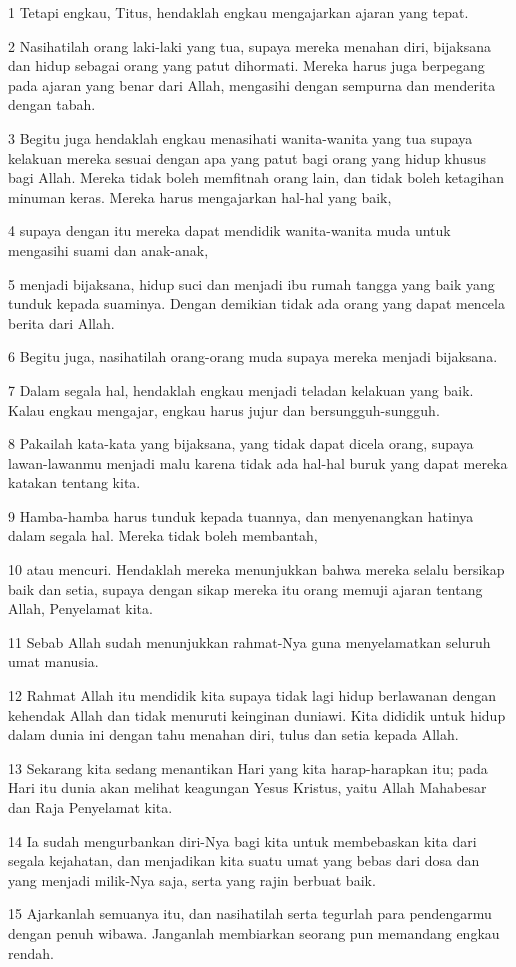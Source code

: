 \par 1 Tetapi engkau, Titus, hendaklah engkau mengajarkan ajaran yang tepat.
\par 2 Nasihatilah orang laki-laki yang tua, supaya mereka menahan diri, bijaksana dan hidup sebagai orang yang patut dihormati. Mereka harus juga berpegang pada ajaran yang benar dari Allah, mengasihi dengan sempurna dan menderita dengan tabah.
\par 3 Begitu juga hendaklah engkau menasihati wanita-wanita yang tua supaya kelakuan mereka sesuai dengan apa yang patut bagi orang yang hidup khusus bagi Allah. Mereka tidak boleh memfitnah orang lain, dan tidak boleh ketagihan minuman keras. Mereka harus mengajarkan hal-hal yang baik,
\par 4 supaya dengan itu mereka dapat mendidik wanita-wanita muda untuk mengasihi suami dan anak-anak,
\par 5 menjadi bijaksana, hidup suci dan menjadi ibu rumah tangga yang baik yang tunduk kepada suaminya. Dengan demikian tidak ada orang yang dapat mencela berita dari Allah.
\par 6 Begitu juga, nasihatilah orang-orang muda supaya mereka menjadi bijaksana.
\par 7 Dalam segala hal, hendaklah engkau menjadi teladan kelakuan yang baik. Kalau engkau mengajar, engkau harus jujur dan bersungguh-sungguh.
\par 8 Pakailah kata-kata yang bijaksana, yang tidak dapat dicela orang, supaya lawan-lawanmu menjadi malu karena tidak ada hal-hal buruk yang dapat mereka katakan tentang kita.
\par 9 Hamba-hamba harus tunduk kepada tuannya, dan menyenangkan hatinya dalam segala hal. Mereka tidak boleh membantah,
\par 10 atau mencuri. Hendaklah mereka menunjukkan bahwa mereka selalu bersikap baik dan setia, supaya dengan sikap mereka itu orang memuji ajaran tentang Allah, Penyelamat kita.
\par 11 Sebab Allah sudah menunjukkan rahmat-Nya guna menyelamatkan seluruh umat manusia.
\par 12 Rahmat Allah itu mendidik kita supaya tidak lagi hidup berlawanan dengan kehendak Allah dan tidak menuruti keinginan duniawi. Kita dididik untuk hidup dalam dunia ini dengan tahu menahan diri, tulus dan setia kepada Allah.
\par 13 Sekarang kita sedang menantikan Hari yang kita harap-harapkan itu; pada Hari itu dunia akan melihat keagungan Yesus Kristus, yaitu Allah Mahabesar dan Raja Penyelamat kita.
\par 14 Ia sudah mengurbankan diri-Nya bagi kita untuk membebaskan kita dari segala kejahatan, dan menjadikan kita suatu umat yang bebas dari dosa dan yang menjadi milik-Nya saja, serta yang rajin berbuat baik.
\par 15 Ajarkanlah semuanya itu, dan nasihatilah serta tegurlah para pendengarmu dengan penuh wibawa. Janganlah membiarkan seorang pun memandang engkau rendah.

